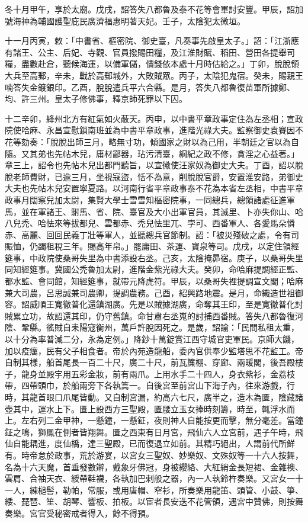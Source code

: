 \begin{pinyinscope}
 冬十月甲午，享於太廟。戊戌，詔答失八都魯及泰不花等會軍討安豐。甲辰，詔加號海神為輔國護聖庇民廣濟福惠明著天妃。壬子，太陰犯太微垣。



 十一月丙寅，敕：「中書省、樞密院、御史臺，凡奏事先啟皇太子。」詔：「江浙應有諸王、公主、后妃、寺觀、官員撥賜田糧，及江淮財賦、稻田、營田各提舉司糧，盡數赴倉，聽候海運，以備軍儲，價錢依本處十月時估給之。」丁卯，脫脫領大兵至高郵，辛未，戰於高郵城外，大敗賊眾。丙子，太陰犯鬼宿。癸未，賜親王喃答失金鍍銀印。乙酉，脫脫遣兵平六合縣。是月，答失八都魯復苗軍所據鄭、均、許三州。皇太子修佛事，釋京師死罪以下囚。



 十二辛卯，絳州北方有紅氣如火蔽天。丙申，以中書平章政事定住為左丞相；宣政院使哈麻、永昌宣慰鎖南班並為中書平章政事，進階光祿大夫。監察御史袁賽因不花等劾奏：「脫脫出師三月，略無寸功，傾國家之財以為己用，半朝廷之官以為自隨。又其弟也先帖木兒，庸材鄙器，玷污清臺，綱紀之政不修，貪淫之心益著。」章三上，詔令也先帖木兒出都門聽旨，以宣徽使汪家奴為御史大夫。丁酉，詔以脫脫老師費財，已逾三月，坐視寇盜，恬不為意，削脫脫官爵，安置淮安路，弟御史大夫也先帖木兒安置寧夏路。以河南行省平章政事泰不花為本省左丞相，中書平章政事月闊察兒加太尉，集賢大學士雪雪知樞密院事，一同總兵，總領諸處征進軍馬，並在軍諸王、駙馬、省、院、臺官及大小出軍官員，其滅里、卜亦失你山、哈八兒禿、哈怯來等拔都兒、雲都赤、禿兒怯里兀、孛可、西番軍人、各愛馬朵憐赤、高麗、回回民義丁壯等軍人，並聽總兵官節制。詔：「被災殘破之處，令有司賑恤，仍蠲租稅三年。賜高年帛。」罷庸田、茶運、寶泉等司。戊戌，以定住領經筵事，中政院使桑哥失里為中書添設右丞。己亥，太陰掩昴宿。庚子，以桑哥失里同知經筵事。冀國公禿魯加太尉，進階金紫光祿大夫。癸卯，命哈麻提調經正監、都水監、會同館，知經筵事，就帶元降虎符。甲辰，以桑哥失裡提調宣文閣；哈麻兼大司農，呂思誠兼司農卿，提調農務。己酉，紹興路地震。是月，命織造世祖御容。詔威順王寬徹普化還鎮湖廣。先是以賊據湖廣，命奪其王印，至是寬徹普化討賊累立功，故詔還其印，仍守舊鎮。命甘肅右丞嵬的討捕西番賊。答失八都魯復河陰、鞏縣。徭賊自耒陽寇衡州，萬戶許脫因死之。是歲，詔諭：「民間私租太重，以十分為率普減二分，永為定例。」降鈔十萬錠賞江西守城官吏軍民。京師大饑，加以疫癘，民有父子相食者。帝於內苑造龍船，委內官供奉少監塔思不花監工。帝自制其樣，船首尾長一百二十尺，廣二十尺，前瓦簾棚、穿廊、兩暖閣，後吾殿樓子，龍身並殿宇用五彩金妝，前有兩爪。上用水手二十四人，身衣紫衫，金荔枝帶，四帶頭巾，於船兩旁下各執篙一。自後宮至前宮山下海子內，往來游戲，行時，其龍首眼口爪尾皆動。又自制宮漏，約高六七尺，廣半之，造木為匱，陰藏諸壺其中，運水上下。匱上設西方三聖殿，匱腰立玉女捧時刻籌，時至，輒浮水而上。左右列二金甲神，一懸鐘，一懸鉦，夜則神人自能按更而擊，無分毫差。當鐘鉦之鳴，獅鳳在側者皆翔舞。匱之西東有日月宮，飛仙六人立宮前，遇子午時，飛仙自能耦進，度仙橋，達三聖殿，已而復退立如前。其精巧絕出，人謂前代所鮮有。時帝怠於政事，荒於游宴，以宮女三聖奴、妙樂奴、文殊奴等一十六人按舞，名為十六天魔，首垂發數辮，戴象牙佛冠，身被纓絡、大紅綃金長短裙、金雜襖、雲肩、合袖天衣、綬帶鞋襪，各執加巴剌般之器，內一人執鈴杵奏樂。又宮女一十一人，練槌髻，勒帕，常服，或用唐帽、窄衫，所奏樂用龍笛、頭管、小鼓、箏、緌、琵琶、笙、胡琴、響板、拍板。以宦者長安迭不花管領，遇宮中贊佛，則按舞奏樂。宮官受秘密戒者得入，餘不得預。



\end{pinyinscope}